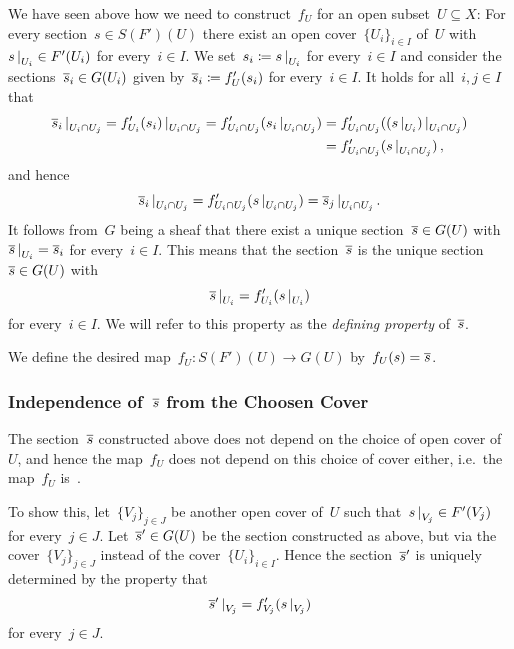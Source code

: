 We have seen above how we need to construct~$f_U$ for an open subset~$U \subseteq X$:
For every section~$s \in S(F')(U)$ there exist an open cover~$\{ U_i \}_{i \in I}$ of~$U$ with~$\restrict{s}{U_i} \in F'(U_i)$ for every~$i \in I$.
We set~$s_i \defined \restrict{s}{U_i}$ for every~$i \in I$ and consider the sections~$\overline{s}_i \in G(U_i)$ given by~$\overline{s}_i \coloneqq f'_U(s_i)$ for every~$i \in I$.
It holds for all~$i,j \in I$ that
\begin{align*}
      \restrict{\induced{s}_i}{U_i \cap U_j}
   =  \restrict{f'_{U_i}(s_i)}{U_i \cap U_j}
   =  f'_{U_i \cap U_j}(\restrict{s_i}{U_i \cap U_j})
  &=  f'_{U_i \cap U_j}(\restrict{(\restrict{s}{U_i})}{U_i \cap U_j}) \\
  &=  f'_{U_i \cap U_j}(\restrict{s}{U_i \cap U_j}) \,,
\end{align*}
and hence
\[
    \restrict{\induced{s}_i}{U_i \cap U_j}
  = f'_{U_i \cap U_j}(\restrict{s}{U_i \cap U_j})
  = \restrict{\induced{s}_j}{U_i \cap U_j} \,.
\]
It follows from~$G$ being a sheaf that there exist a unique section~$\overline{s} \in G(U)$ with~$\restrict{\induced{s}}{U_i} = \induced{s}_i$ for every~$i \in I$.
This means that the section~$\overline{s}$ is the unique section~$\overline{s} \in G(U)$ with
\[
    \restrict{\induced{s}}{U_i}
  = f'_{U_i}(\restrict{s}{U_i})
\]
for every~$i \in I$.
We will refer to this property as the \emph{defining property} of~$\overline{s}$.

We define the desired map~$f_U \colon S(F')(U) \to G(U)$ by~$f_U(s) = \overline{s}$.



\subsubsection*{Independence of~$\overline{s}$ from the Choosen Cover}

The section~$\overline{s}$ constructed above does not depend on the choice of open cover of~$U$, and hence the map~$f_U$ does not depend on this choice of cover either, i.e.\ the map~$f_U$ is~{\welldef}.

To show this, let~$\{ V_j \}_{j \in J}$ be another open cover of~$U$ such that~$\restrict{s}{V_j} \in F'(V_j)$ for every~$j \in J$.
Let~$\overline{s}' \in G(U)$ be the section constructed as above, but via the cover~$\{ V_j \}_{j \in J}$ instead of the cover~$\{ U_i \}_{i \in I}$.
Hence the section~$\overline{s}'$ is uniquely determined by the property that
\[
    \restrict{ \induced{s}' }{V_j}
  = f'_{V_j}( \restrict{s}{V_j} )
\]
for every~$j \in J$.

